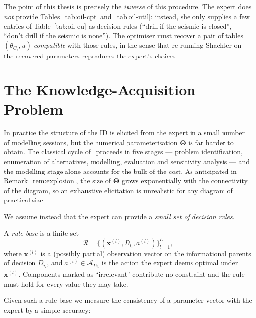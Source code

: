 The point of this thesis is precisely the \emph{inverse} of this
procedure. The expert does \emph{not} provide
Tables~\ref{tab:oil-cpt} and~\ref{tab:oil-util}: instead, she only
supplies a few entries of Table~\ref{tab:oil-eu} as decision rules
(``drill if the seismic is closed'', ``don't drill if the seismic is
none''). The optimiser must recover a pair of tables
$(\theta_{C_i}, u)$ \emph{compatible} with those rules, in the sense
that re-running Shachter on the recovered parameters reproduces the
expert's choices.

\section{The Knowledge-Acquisition Problem}

In practice the structure of the ID is elicited from the expert in a
small number of modelling sessions, but the numerical
parameterisation $\boldsymbol{\Theta}$ is far harder to obtain. The
classical cycle of~\cite{bielza2000issues,bielza2010modeling} proceeds in
five stages — problem identification, enumeration of alternatives,
modelling, evaluation and sensitivity analysis — and the modelling
stage alone accounts for the bulk of the cost. As anticipated in
Remark~\ref{rem:explosion}, the size of $\boldsymbol{\Theta}$ grows
exponentially with the connectivity of the diagram, so an exhaustive
elicitation is unrealistic for any diagram of practical size.

We assume instead that the expert can provide a \emph{small set of
decision rules}.

\begin{definition}
\label{def:rules}
A \emph{rule base} is a finite set
\[
   \mathcal{R} = \bigl\{(\mathbf{x}^{(l)}, D_{i_l}, a^{(l)})\bigr\}_{l=1}^{L},
\]
where $\mathbf{x}^{(l)}$ is a (possibly partial) observation vector
on the informational parents of decision $D_{i_l}$, and
$a^{(l)}\in\mathcal{A}_{D_{i_l}}$ is the action the expert deems
optimal under $\mathbf{x}^{(l)}$. Components marked as
``irrelevant'' contribute no constraint and the rule must hold for
every value they may take.
\end{definition}

Given such a rule base we measure the consistency of a parameter
vector with the expert by a simple accuracy:

